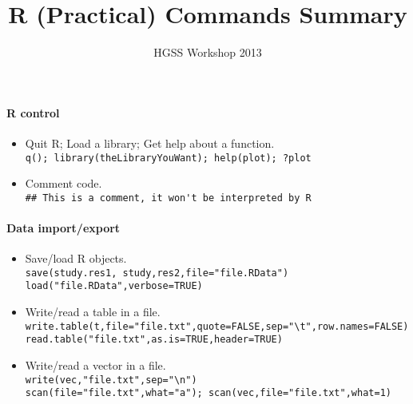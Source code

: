 \documentclass[12pt]{article}
\title{R (Practical) Commands Summary}
\author{\tiny HGSS Workshop 2013}
\date{}
\begin{document}
\maketitle

\paragraph{R control}
\begin{itemize} 
  \item Quit R; Load a library; Get help about a function. \\
    \verb!q(); library(theLibraryYouWant); help(plot); ?plot!
  \item Comment code. \\
    \verb!## This is a comment, it won't be interpreted by R!
\end{itemize}

\paragraph{Data import/export}
\begin{itemize} 
  \item Save/load R objects. \\
    \verb!save(study.res1, study,res2,file="file.RData")! \\
    \verb!load("file.RData",verbose=TRUE)!
  \item Write/read a table in a file. \\ 
    \verb!write.table(t,file="file.txt",quote=FALSE,sep="\t",row.names=FALSE)! \\
    \verb!read.table("file.txt",as.is=TRUE,header=TRUE)! 
  \item Write/read a vector in a file. \\ 
    \verb!write(vec,"file.txt",sep="\n")! \\
    \verb!scan(file="file.txt",what="a"); scan(vec,file="file.txt",what=1)!
\end{itemize}


\end{document}
